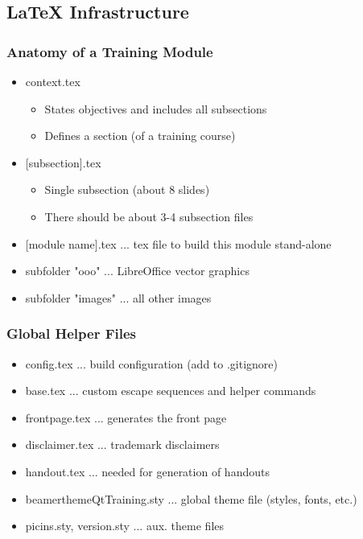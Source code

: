 %
%
%
%

\subsection{LaTeX Infrastructure}

\begin{slide}
  \frametitle{Anatomy of a Training Module}
  \begin{itemize}
    \item context.tex
    \begin{itemize}
      \item States objectives and includes all subsections
      \item Defines a section (of a training course)
    \end{itemize}
    \item{} [subsection].tex
    \begin{itemize}
      \item Single subsection (about 8 slides)
      \item There should be about 3-4 subsection files
    \end{itemize}
    \item{} [module name].tex ... tex file to build this module stand-alone
    \item subfolder "ooo" ... LibreOffice vector graphics
    \item subfolder "images" ... all other images
  \end{itemize}
\end{slide}

\begin{slide}
  \frametitle{Global Helper Files}
  \begin{itemize}
    \item config.tex ... build configuration (add to .gitignore)
    \item base.tex ... custom escape sequences and helper commands
    \item frontpage.tex ... generates the front page
    \item disclaimer.tex ... trademark disclaimers
    \item handout.tex ... needed for generation of handouts
    \item beamerthemeQtTraining.sty ... global theme file (styles, fonts, etc.)
    \item picins.sty, version.sty ... aux. theme files
  \end{itemize}
\end{slide}
